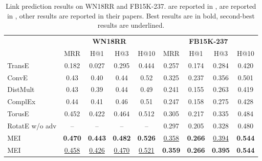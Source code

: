 \documentclass{ecai}
\theoremstyle{plain}  \newtheorem{thm}{Theorem}  \newtheorem{lem}[thm]{Lemma}  \newtheorem{prop}[thm]{Proposition}
\theoremstyle{remark}  \newtheorem*{rem}{Remark}
\begin{document}
\begin{table*}

	\caption[Link prediction results on WN18RR and FB15K-237.]{Link prediction results on WN18RR and FB15K-237.  are reported in \cite{ebisu_generalizedtranslationbasedembedding_2019},  are reported in \cite{dettmers_convolutional2dknowledge_2018}, other results are reported in their papers. Best results are in bold, second-best results are underlined.}
	\label{tab:result_hard}
	\centering	
	\begin{adjustbox}{max width=\textwidth}
		\begin{tabular}{@{\extracolsep{2pt}}lcccccccc@{}}
			
			\toprule
			
			& \multicolumn{4}{c}{\textbf{WN18RR}} & \multicolumn{4}{c}{\textbf{FB15K-237}} \\
			\cmidrule(lr){2-5} \cmidrule(lr){6-9}
			& MRR & H@1 & H@3 & H@10 & MRR & H@1 & H@3 & H@10 \\ 
			\hline
			
			TransE \cite{bordes_translatingembeddingsmodeling_2013}  & 0.182 & 0.027 & 0.295 & 0.444 & 0.257 & 0.174 & 0.284 & 0.420 \\


ConvE \cite{dettmers_convolutional2dknowledge_2018} & 0.43 & 0.40 & 0.44 & 0.52 & 0.325 & 0.237 & 0.356 & 0.501 \\


			DistMult \cite{yang_embeddingentitiesrelations_2015}  & 0.43 & 0.39 & 0.44 & 0.49 & 0.241 & 0.155 & 0.263 & 0.419 \\
			ComplEx \cite{trouillon_complexembeddingssimple_2016}  & 0.44 & 0.41 & 0.46 & 0.51 & 0.247 & 0.158 & 0.275 & 0.428 \\
			
TorusE \cite{ebisu_generalizedtranslationbasedembedding_2019} & 0.452 & 0.422 & 0.464 & 0.512 & 0.305 & 0.217 & 0.335 & 0.484 \\
			RotatE w/o adv \cite{sun_rotateknowledgegraph_2019} & -- & -- & -- & -- & 0.297 & 0.205 & 0.328 & 0.480 \\  

\hline
			






			MEI & \textbf{0.470} & \textbf{0.443} & \textbf{0.482} & \textbf{0.526} & \underline{0.358} & \textbf{0.266} & \underline{0.394} & \textbf{0.544} \\  



			MEI & \underline{0.458} & \underline{0.426} & \underline{0.470} & \underline{0.521} & \textbf{0.359} & \textbf{0.266} & \textbf{0.395} & \textbf{0.544} \\  

			\bottomrule
			
		\end{tabular}
	\end{adjustbox}
\end{table*}
\end{document}
